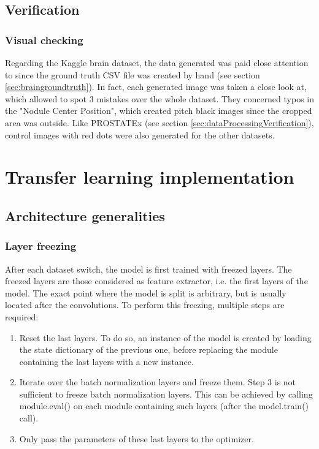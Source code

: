 \subsection{Verification}
\subsubsection{Visual checking}
Regarding the Kaggle brain dataset, the data generated was paid close attention to since the ground truth CSV file was created by hand (see section \ref{sec:braingroundtruth}). In fact, each generated image was taken a close look at, which allowed to spot 3 mistakes over the whole dataset. They concerned typos in the "Nodule Center Position", which created pitch black images since the cropped area was outside.
Like PROSTATEx (see section \ref{sec:dataProcessingVerification}), control images with red dots were also generated for the other datasets. 


\section{Transfer learning implementation}
\subsection{Architecture generalities}

\subsubsection{Layer freezing}
After each dataset switch, the model is first trained with freezed layers. The freezed layers are those considered as feature extractor, i.e. the first layers of the model. The exact point where the model is split is arbitrary, but is usually located after the convolutions. To perform this freezing, multiple steps are required:
\begin{enumerate}
	\item Reset the last layers. To do so, an instance of the model is created by loading the state dictionary of the previous one, before replacing the module containing the last layers with a new instance. 
	\item Iterate over the batch normalization layers and freeze them. Step 3 is not sufficient to freeze batch normalization layers. This can be achieved by calling module.eval() on each module containing such layers (after the model.train() call). 
	\item Only pass the parameters of these last layers to the optimizer.
\end{enumerate}


